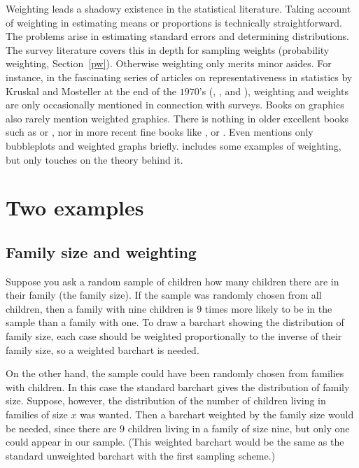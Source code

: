 \documentclass{svmult}
\begin{document}
Weighting leads a shadowy existence in the statistical literature.  Taking account of weighting in estimating means or proportions is technically straightforward.  The problems arise in estimating standard errors and determining distributions.  The survey literature covers this in depth for sampling weights (probability weighting, Section~\ref{pw}). Otherwise weighting only merits minor asides.  For instance, in the fascinating series of articles on representativeness in statistics by Kruskal and Mosteller at the end of the $1970$'s (\cite{kruskal1:1979}, \cite{kruskal2:1979}, \cite{kruskal3:1979} and \cite{kruskal:1980}), weighting and weights are only occasionally mentioned in connection with surveys.  Books on graphics also rarely mention weighted graphics.  There is nothing in older excellent books such as \cite{chambers:1983} or \cite{cleveland:1994}, nor in more recent fine books like \cite{Murrell:2005}, \cite{young:2006} or \cite{cook:2007}.  Even \cite{wilkinson:2005} mentions only bubbleplots and weighted graphs briefly.  \cite{unwin:2006} includes some examples of weighting, but only touches on the theory behind it.

\section{Two examples}
\label{exs}

\subsection{Family size and weighting}
\label{family}
Suppose you ask a random sample of children how many children there are in their family (the family size).  If the sample was randomly chosen from all children, then a family with nine children is $9$ times more likely to be in the sample than a family with one.  To draw a barchart showing the distribution of family size, each case should be weighted proportionally to the inverse of their family size, so a weighted barchart is needed.

On the other hand, the sample could have been randomly chosen from families with children.  In this case the standard barchart gives the distribution of family size.  Suppose, however, the distribution of the number of children living in families of size $x$ was wanted.  Then a barchart weighted by the family size would be needed, since there are $9$ children living in a family of size nine, but only one could appear in our sample.  (This weighted barchart would be the same as the standard unweighted barchart with the first sampling scheme.)
\end{document}
